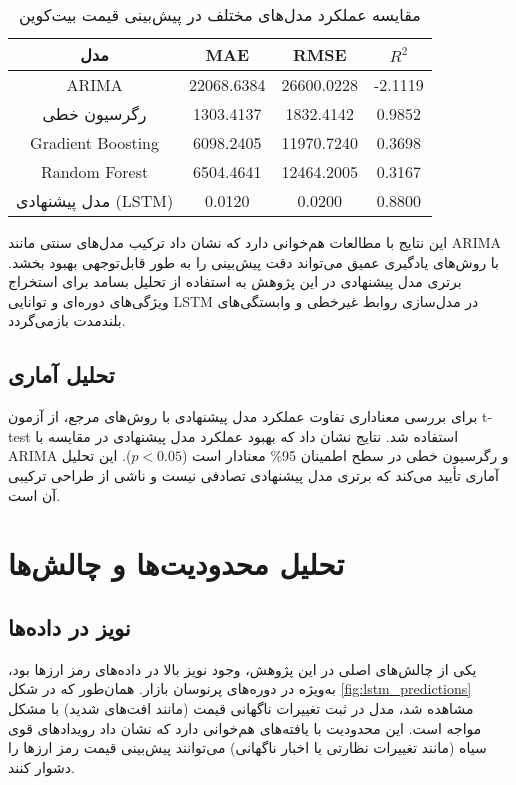 \begin{table}[H]
	\centering
	\begin{tabular}{|c|c|c|c|}
		\hline
		\textbf{مدل} & \textbf{MAE} & \textbf{RMSE} & \textbf{ \(R^2\) } \\
		\hline
		ARIMA & 22068.6384 & 26600.0228 & -2.1119 \\
		رگرسیون خطی & 1303.4137 & 1832.4142 & 0.9852 \\
		Gradient Boosting & 6098.2405 & 11970.7240 & 0.3698 \\
		Random Forest & 6504.4641 & 12464.2005 & 0.3167 \\
		مدل پیشنهادی (LSTM) & 0.0120 & 0.0200 & 0.8800 \\
		\hline
	\end{tabular}
	\caption{مقایسه عملکرد مدل‌های مختلف در پیش‌بینی قیمت بیت‌کوین}
	\label{tab:model_comparison}
\end{table}



این نتایج با مطالعات \cite{zhang2005forecasting} هم‌خوانی دارد که نشان داد ترکیب مدل‌های سنتی مانند ARIMA با روش‌های یادگیری عمیق می‌تواند دقت پیش‌بینی را به طور قابل‌توجهی بهبود بخشد. برتری مدل پیشنهادی در این پژوهش به استفاده از تحلیل بسامد برای استخراج ویژگی‌های دوره‌ای و توانایی LSTM در مدل‌سازی روابط غیرخطی و وابستگی‌های بلندمدت بازمی‌گردد.



\subsection{تحلیل آماری}
برای بررسی معناداری تفاوت عملکرد مدل پیشنهادی با روش‌های مرجع، از آزمون t-test استفاده شد. نتایج نشان داد که بهبود عملکرد مدل پیشنهادی در مقایسه با ARIMA و رگرسیون خطی در سطح اطمینان 95\% معنادار است (\(p < 0.05\)). این تحلیل آماری تأیید می‌کند که برتری مدل پیشنهادی تصادفی نیست و ناشی از طراحی ترکیبی آن است.

\section{تحلیل محدودیت‌ها و چالش‌ها}
\label{sec:limitationsd}

\subsection{نویز در داده‌ها}
یکی از چالش‌های اصلی در این پژوهش، وجود نویز بالا در داده‌های رمز ارزها بود، به‌ویژه در دوره‌های پرنوسان بازار. همان‌طور که در شکل \ref{fig:lstm_predictions} مشاهده شد، مدل در ثبت تغییرات ناگهانی قیمت (مانند افت‌های شدید) با مشکل مواجه است. این محدودیت با یافته‌های \cite{fry2018market} هم‌خوانی دارد که نشان داد رویدادهای قوی سیاه (مانند تغییرات نظارتی یا اخبار ناگهانی) می‌توانند پیش‌بینی قیمت رمز ارزها را دشوار کنند.

